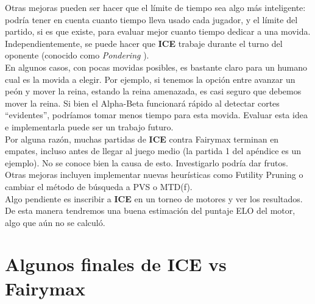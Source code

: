 \documentclass{article}
\newcommand{\ICE}[0]{{\bf ICE}}
\begin{document}
\begin{multicols}{2}
Otras mejoras pueden ser hacer que el límite de tiempo sea algo más
inteligente: podría tener en cuenta cuanto tiempo lleva usado cada
jugador, y el límite del partido, si es que existe, para evaluar
mejor cuanto tiempo dedicar a una movida. Independientemente, se puede
hacer que \ICE{} trabaje durante el turno del oponente (conocido como
\emph{Pondering}\cite{pondering} \cite{wiki:pondering}).
\\

En algunos casos, con pocas movidas posibles, es bastante claro para un
humano cual es la movida a elegir. Por ejemplo, si tenemos la opción
entre avanzar un peón y mover la reina, estando la reina amenazada,
es casi seguro que debemos mover la reina. Si bien el Alpha-Beta
funcionará rápido al detectar cortes ``evidentes'', podríamos tomar
menos tiempo para esta movida. Evaluar esta idea e implementarla puede
ser un trabajo futuro.
\\

Por alguna razón, muchas partidas de \ICE{} contra Fairymax terminan
en empates, incluso antes de llegar al juego medio (la partida 1
del apéndice es un ejemplo). No se conoce bien la causa de esto.
Investigarlo podría dar frutos.
\\

Otras mejoras incluyen implementar nuevas heurísticas como Futility
Pruning o cambiar el método de búsqueda a PVS o MTD(f).
\\

Algo pendiente es inscribir a \ICE{} en un torneo de motores y ver los
resultados. De esta manera tendremos una buena estimación del puntaje
ELO del motor, algo que aún no se calculó.




\end{multicols}

\newpage
\appendix
\section{Algunos finales de \ICE{} vs Fairymax}

\newcommand{\tie}[0]{\nicefrac{1}{2}-\nicefrac{1}{2}}
\newcommand{\game}[2]{
	\newchessgame
	\parbox{0.5\textwidth}{
	\begin{center}
	 #2 \\
	 \hidemoves{#1}
	 \chessboard[arrow=to,
		       smallboard,
		       lastmoveid,
		       showmover=false,
		       pgfstyle=straightmove,color=red,
		       markmove=\xskakget{movefrom}-\xskakget{moveto},
	 ]
	\end{center}
	}
}
\end{document}
